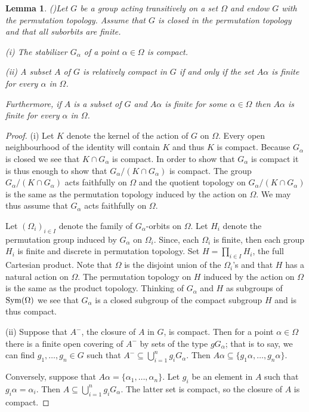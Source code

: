 \documentclass{emsprocart}
\newtheorem{lemma}[theorem]{Lemma}
\theoremstyle{definition}
\begin{document}
\begin{lemma}{\rm (\cite[Lemma 1 and Lemma 2]{Woess1992})}\label{LCompact}
Let  $G$ be a group acting transitively on a set $\Omega$ and endow
$G$ with the permutation topology.
Assume that  $G$ is closed in the permutation topology and that all suborbits are finite.

(i) The stabilizer $G_\alpha$ of a point $\alpha \in \Omega$ is
compact.

(ii) A subset $A$ of $G$ is
 relatively compact
 in $G$ if and only if the set $A\alpha$ is finite for every $\alpha$
in $\Omega$.

Furthermore, if $A$ is a subset of $G$ and $A\alpha$
is finite for some $\alpha\in\Omega$ then $A\alpha$ is finite for every
$\alpha$ in $\Omega$.
\end{lemma}

\begin{proof}  (i)  Let $K$ denote the kernel of the action of $G$ on
  $\Omega$.  Every open neighbourhood of the identity will contain $K$
  and thus $K$ is compact.  Because $G_\alpha$ is closed we see that
  $K\cap G_\alpha$ is compact.  In order to show that $G_\alpha$
  is compact it is thus enough to show that $G_\alpha/(K\cap
  G_\alpha)$ is compact.  The group $G_\alpha/(K\cap
  G_\alpha)$ acts faithfully on $\Omega$ and the quotient topology on 
$G_\alpha/(K\cap G_\alpha)$ is the same as the permutation topology
  induced by the action on $\Omega$. We may thus assume that
  $G_\alpha$ acts faithfully on $\Omega$.

Let $(\Omega_i)_{i\in I}$ denote the family of $G_\alpha$-orbits on
$\Omega$.  Let $H_i$ denote the permutation group induced by
$G_\alpha$ on $\Omega_i$.  Since, each $\Omega_i$ is finite, then each
group $H_i$ is finite and discrete in permutation topology.  
Set $H=\prod_{i\in I} H_i$, the full Cartesian product.  Note that
$\Omega$ is the disjoint union of the $\Omega_i$'s and that $H$ has a
natural action on $\Omega$.  The
permutation topology on $H$ induced by the action on $\Omega$ is the
same as the product topology.  Thinking of $G_\alpha$ and $H$ as
subgroups of ${\mbox{${\rm Sym}$}}(\Omega)$ we see that $G_\alpha$ is a closed
subgroup of the compact subgroup $H$ and is thus compact.

(ii)  Suppose that ${A}^-$, the closure of $A$ in $G$,
 is compact.  Then for a point
 $\alpha\in \Omega$ there is a finite open
 covering of ${A}^-$ by sets of the type $gG_\alpha$; that is to
 say,
 we can find $g_1,\ldots,g_n\in G$ such that
 ${A}^-\subseteq\bigcup_{i=1}^n g_iG_\alpha$.  Then $A\alpha\subseteq
 \{g_1\alpha, \ldots,g_n\alpha\}$.

Conversely, suppose that $A\alpha=\{\alpha_1,\ldots,\alpha_n\}$.
 Let $g_i$ be an element in $A$
 such that $g_i\alpha=\alpha_i$.  Then
$A\subseteq\bigcup_{i=1}^n g_iG_\alpha$.
The latter set is compact, so the closure of $A$ is compact.
\end{proof}
\end{document}
